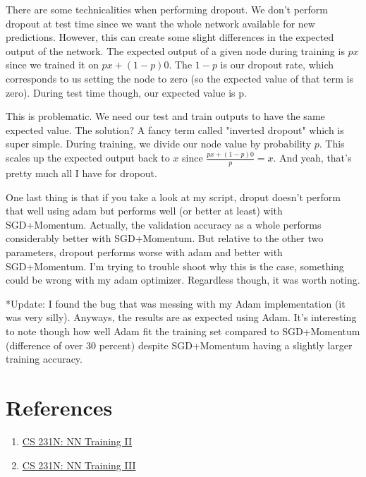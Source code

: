 \documentclass[12pt]{article}
\begin{document}
There are some technicalities when performing dropout. We don't perform dropout at test time since we 
want the whole network available for new predictions. However, this can create some slight differences 
in the expected output of the network. The expected output of a given node during training is 
$px$ since we trained it on $px + (1-p)0$. The $1-p$ is our dropout rate, which corresponds to us 
setting the node to zero (so the expected value of that term is zero). During test time though, our 
expected value is p. 

This is problematic. We need our test and train outputs to have the same expected value. The solution? 
A fancy term called "inverted dropout" which is super simple. During training, we
divide our node value by probability $p$. This scales up the expected output back to $x$ since 
$\frac{px + (1-p)0}{p} = x$. And yeah, that's pretty much all I have for dropout. 

One last thing is that if you take a look at my script, droput doesn't perform that well using adam 
but performs well (or better at least) with SGD+Momentum. Actually, the validation accuracy as a 
whole performs considerably better with SGD+Momentum. But relative to the other two parameters, dropout
performs worse with adam and better with SGD+Momentum. I'm trying to trouble shoot why this is the case, 
something could be wrong with my adam optimizer. Regardless though, it was worth noting. 

*Update: I found the bug that was messing with my Adam implementation (it was very silly). Anyways, the 
results are as expected using Adam. It's interesting to note though how well Adam fit the training
set compared to SGD+Momentum (difference of over 30 percent) despite SGD+Momentum having a slightly 
larger training accuracy. 
\section{References}

\begin{enumerate}
    \item \href{https://cs231n.github.io/neural-networks-2}{CS 231N: NN Training II}
    \item \href{https://cs231n.github.io/neural-networks-3}{CS 231N: NN Training III}
\end{enumerate}
\end{document}
